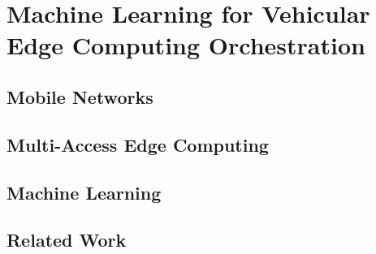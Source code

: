 \chapter{Machine Learning for Vehicular Edge Computing Orchestration}

\section{Mobile Networks}


\section{Multi-Access Edge Computing}


\section{Machine Learning}


\section{Related Work}
